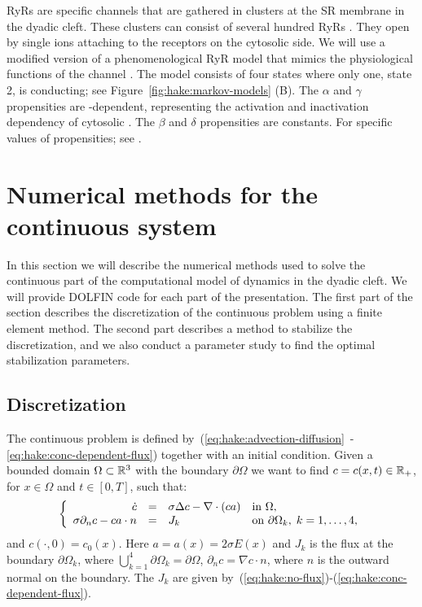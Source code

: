 RyRs are \Ca specific channels that are gathered in clusters at the SR
membrane in the dyadic cleft. These clusters can consist of several
hundred RyRs
\citep{BeuckelmannWier1988,Franzini-ArmstrongProtasiRamesh1999}. They
open by single \Ca ions attaching to the receptors on the cytosolic
side. We will use a modified version of a phenomenological RyR model
that mimics the physiological functions of the channel
\citep{SternSongEtAl1999}. The model consists of four states where only
one, state 2, is conducting; see Figure~\ref{fig:hake:markov-models}
(B). The $\alpha$ and $\gamma$ propensities are \Ca-dependent,
representing the activation and inactivation dependency of cytosolic
\CaC. The $\beta$ and $\delta$ propensities are constants. For
specific values of propensities; see \citet{SternSongEtAl1999}.

\section{Numerical methods for the continuous system}
In this section we will describe the numerical methods used to solve
the continuous part of the computational model of \Ca dynamics in the
dyadic cleft. We will provide DOLFIN code for each part of the
presentation. The first part of the section describes the
discretization of the continuous problem using a finite element
method. The second part describes a method to stabilize the
discretization, and we also conduct a parameter study to find the
optimal stabilization parameters.


\subsection{Discretization}
\label{sec:hake:discretization}

The continuous problem is defined
by~(\ref{eq:hake:advection-diffusion}~-\ref{eq:hake:conc-dependent-flux})
together with an initial condition. Given a bounded domain $\Omega
\subset \mathbb{R}^3$ with the boundary $\partial\Omega$ we want to find
$c = c(x,t) \in \mathbb{R}_+$, for $x\in \Omega$ and $t \in [0,T]$, such
that:
\begin{equation}
\label{eq:hake:full_system}
\left\{
  \begin{array}{r@{\quad=\quad}ll}
    \dot{c}&\sigma\Delta c - \nabla\cdot\left(ca\right)&  \text{in } \Omega, \\
    \sigma\partial_nc-ca\cdot n&J_k& \text{on } \partial\Omega_k,\; k = 1,\ldots,4,
  \end{array}
\right.
\end{equation}
and $c(\cdot,0) = c_0(x)$. Here $a=a(x)=2\sigma E(x)$ and $J_k$ is the
\kth flux at the \kth boundary $\partial\Omega_k$, where
$\bigcup^4_{k=1}\partial\Omega_k=\partial\Omega$, $\partial_nc =
\nabla c\cdot n$, where $n$ is the outward normal on the boundary. The
$J_k$ are given by~(\ref{eq:hake:no-flux})-(\ref{eq:hake:conc-dependent-flux}).

